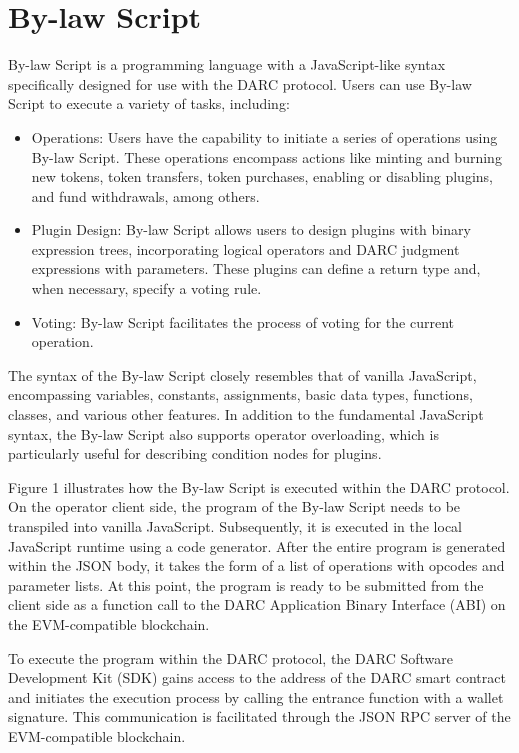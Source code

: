 \documentclass[main.tex]{subfiles}
\begin{document}
\section{By-law Script}

By-law Script is a programming language with a JavaScript-like syntax specifically designed for use with the DARC protocol. Users can use By-law Script to execute a variety of tasks, including:

\begin{itemize}
    \item Operations: Users have the capability to initiate a series of operations using By-law Script. These operations encompass actions like minting and burning new tokens, token transfers, token purchases, enabling or disabling plugins, and fund withdrawals, among others.

    \item Plugin Design: By-law Script allows users to design plugins with binary expression trees, incorporating logical operators and DARC judgment expressions with parameters. These plugins can define a return type and, when necessary, specify a voting rule.

    \item Voting: By-law Script facilitates the process of voting for the current operation.
\end{itemize}

The syntax of the By-law Script closely resembles that of vanilla JavaScript, encompassing variables, constants, assignments, basic data types, functions, classes, and various other features. In addition to the fundamental JavaScript syntax, the By-law Script also supports operator overloading, which is particularly useful for describing condition nodes for plugins.

Figure 1 illustrates how the By-law Script is executed within the DARC protocol. On the operator client side, the program of the By-law Script needs to be transpiled into vanilla JavaScript. Subsequently, it is executed in the local JavaScript runtime using a code generator. After the entire program is generated within the JSON body, it takes the form of a list of operations with opcodes and parameter lists. At this point, the program is ready to be submitted from the client side as a function call to the DARC Application Binary Interface (ABI) on the EVM-compatible blockchain.

To execute the program within the DARC protocol, the DARC Software Development Kit (SDK) gains access to the address of the DARC smart contract and initiates the execution process by calling the entrance function with a wallet signature. This communication is facilitated through the JSON RPC server of the EVM-compatible blockchain.
\end{document}
